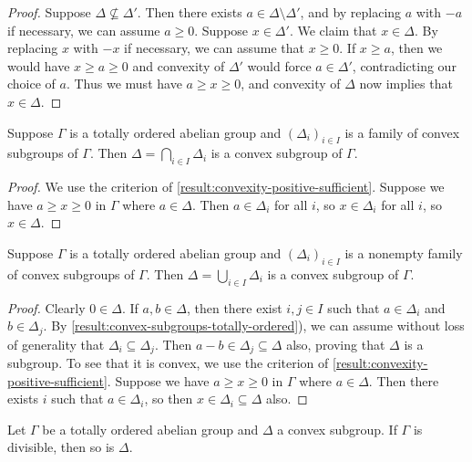 \begin{proof}
	Suppose $\Delta \not\subseteq \Delta'$. Then there exists $a \in \Delta \setminus \Delta'$, and by replacing $a$ with $-a$ if necessary, we can assume $a \geq 0$. Suppose $x \in \Delta'$. We claim that $x \in \Delta$. By replacing $x$ with $-x$ if necessary, we can assume that $x \geq 0$. If $x \geq a$, then we would have $x \geq a \geq 0$ and convexity of $\Delta'$ would force $a \in \Delta'$, contradicting our choice of $a$. Thus we must have $a \geq x \geq 0$, and convexity of $\Delta$ now implies that $x \in \Delta$. 
\end{proof}


\begin{lemma}
	\label{result:intersection-convex}
	Suppose $\Gamma$ is a totally ordered abelian group and $(\Delta_i)_{i \in I}$ is a family of convex subgroups of $\Gamma$. Then $\Delta = \bigcap_{i \in I} \Delta_i$ is a convex subgroup of $\Gamma$. 
\end{lemma}

\begin{proof}
	We use the criterion of \cref{result:convexity-positive-sufficient}. Suppose we have $a \geq x \geq 0$ in $\Gamma$ where $a \in \Delta$. Then $a \in \Delta_i$ for all $i$, so $x \in \Delta_i$ for all $i$, so $x \in \Delta$. 
\end{proof}

\begin{lemma}
	\label{result:union-convex}
	Suppose $\Gamma$ is a totally ordered abelian group and $(\Delta_i)_{i \in I}$ is a nonempty family of convex subgroups of $\Gamma$. Then $\Delta = \bigcup_{i \in I} \Delta_i$ is a convex subgroup of $\Gamma$. 
\end{lemma}

\begin{proof}
Clearly $0 \in \Delta$. If $a, b \in \Delta$, then there exist $i, j \in I$ such that $a \in \Delta_i$ and $b \in \Delta_j$. By \cref{result:convex-subgroups-totally-ordered}), we can assume without loss of generality that $\Delta_i \subseteq \Delta_j$. Then $a - b \in \Delta_j  \subseteq \Delta$ also, proving that $\Delta$ is a subgroup.  
To see that it is convex, we use the criterion of \cref{result:convexity-positive-sufficient}. Suppose we have $a \geq x \geq 0$ in $\Gamma$ where $a \in \Delta$. Then there exists $i$ such that $a \in \Delta_i$, so then $x \in \Delta_i \subseteq \Delta$ also. 
\end{proof}

\begin{lemma}
\label{result:convex-subgroup-divisible}
Let $\Gamma$ be a totally ordered abelian group and $\Delta$ a convex subgroup. If $\Gamma$ is divisible, then so is $\Delta$. 
\end{lemma}

